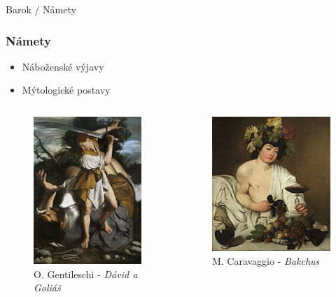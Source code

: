 \documentclass[dvipsnames]{beamer}
\begin{document}
\begin{frame}{\small \textcolor{g}{Barok} / \Large Námety}
	\subsubsection{Námety}
	\begin{itemize}
		\item Náboženské výjavy
		\item Mýtologické postavy
	\end{itemize}
	\begin{columns}
		\kern0pt
		\begin{figure}
			\includegraphics[scale=0.7]{golias}
			\caption{\textcolor{BurntOrange}{O. Gentileschi} - \textit{Dávid a Goliáš}}
		\end{figure}%

		\begin{figure}
			\includegraphics[scale=0.5]{pazzo}
			\caption{\textcolor{BurntOrange}{M. Caravaggio} - \textit{Bakchus}}
		\end{figure}
	\end{columns}

\end{frame}
\end{document}
